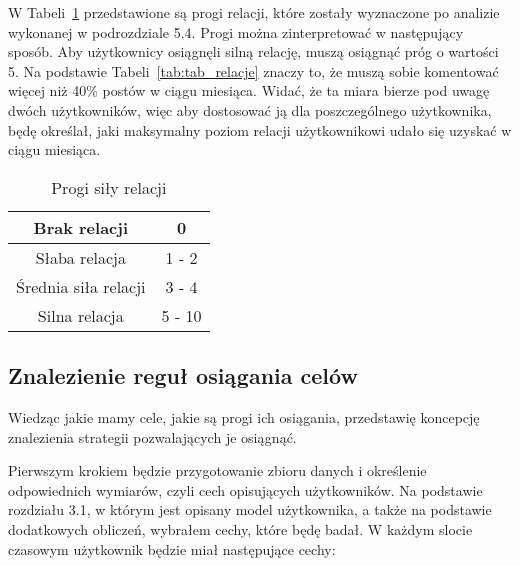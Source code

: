 \documentclass[polish,12pt]{aghthesis}
\begin{document}
W Tabeli~\ref{tab:rel_progi2} przedstawione są progi relacji, które zostały wyznaczone po analizie wykonanej w podrozdziale 5.4. Progi można zinterpretować w następujący sposób. Aby użytkownicy osiągnęli silną relację, muszą osiągnąć próg o wartości 5. Na podstawie Tabeli~\ref{tab:tab_relacje} znaczy to, że muszą sobie komentować więcej niż 40\% postów w ciągu miesiąca. Widać, że ta miara bierze pod uwagę dwóch użytkowników, więc aby dostosować ją dla poszczególnego użytkownika, będę określał, jaki maksymalny poziom relacji użytkownikowi udało się uzyskać w ciągu miesiąca.

\begin{table}[h]
\centering
\begin{tabular}{|c|c|}
\hline
Brak relacji & 0  \\
\hline
Słaba relacja & 1 - 2 \\
\hline
Średnia siła relacji & 3 - 4 \\
\hline
Silna relacja & 5 - 10 \\
\hline
\end{tabular}
\caption[Progi siły relacji]{Progi siły relacji}
\label{tab:rel_progi2}
\end{table}

\FloatBarrier

\subsection{Znalezienie reguł osiągania celów}

Wiedząc jakie mamy cele, jakie są progi ich osiągania, przedstawię koncepcję znalezienia strategii pozwalających je osiągnąć. 

Pierwszym krokiem będzie przygotowanie zbioru danych i określenie odpowiednich wymiarów, czyli cech opisujących użytkowników. Na podstawie rozdziału 3.1, w którym jest opisany model użytkownika, a także na podstawie dodatkowych obliczeń, wybrałem cechy, które będę badał. W każdym slocie czasowym użytkownik będzie miał następujące cechy:
\end{document}
